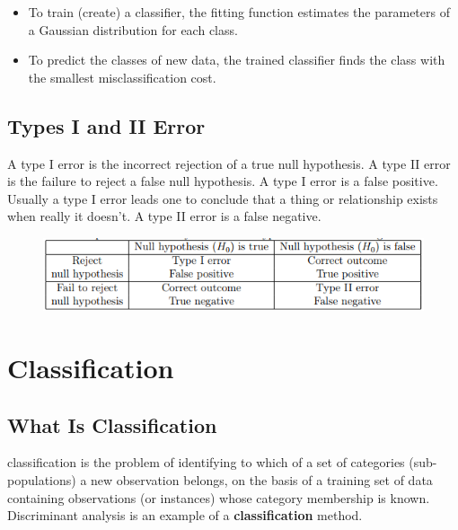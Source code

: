 \documentclass[]{report}
\begin{document}
\begin{itemize}
\item  To train (create) a classifier, the fitting function estimates the parameters
of a Gaussian distribution for each class.
\item  To predict the classes of new data, the trained classifier finds the class
with the smallest misclassification cost.
\end{itemize}
\subsection*{Types I and II Error}
A type I error is the incorrect rejection of a true null hypothesis. A type
II error is the failure to reject a false null hypothesis. A type I error is a
false positive. Usually a type I error leads one to conclude that a thing or
relationship exists when really it doesn’t. A type II error is a false negative.
\begin{figure}[h!]
\centering
\includegraphics[width=0.7\linewidth]{images/Table}
\end{figure}






\section{Classification}
\subsection{What Is Classification}
classification is the problem of identifying to which of a set of categories (sub-populations) a new observation belongs, on the basis of a training set of data containing observations (or instances) whose category membership is known.
Discriminant analysis is an example of a \textbf{classification} method.
\end{document}
